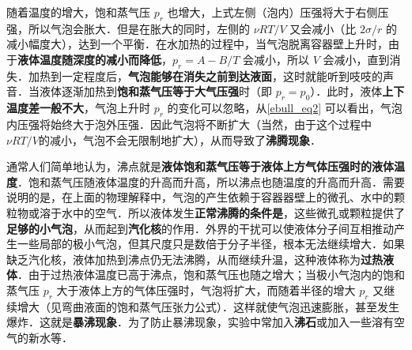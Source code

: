 随着温度的增大，饱和蒸气压 $p_r$ 也增大，上式左侧（泡内）压强将大于右侧压强，所以气泡会胀大．但是在胀大的同时，左侧的 $\nu RT/V$ 又会减小（比 $2\sigma/r$ 的减小幅度大），达到一个平衡．在水加热的过程中，当气泡脱离容器壁上升时，由于\textbf{液体温度随深度的减小而降低}，$p_r=A-B/T$ 会减小，所以 $V$ 会减小，直到消失．加热到一定程度后，\textbf{气泡能够在消失之前到达液面}，这时就能听到吱吱的声音．当液体逐渐加热到\textbf{饱和蒸气压等于大气压强}时（即 $p_r=p_0$）．此时，液体\textbf{上下温度差一般不大}，气泡上升时 $p_r$ 的变化可以忽略，从\autoref{ebull_eq2} 可以看出，气泡内压强将始终大于泡外压强．因此气泡将不断扩大（当然，由于这个过程中 $\nu RT/V$的减小，气泡不会无限制地扩大），从而导致了\textbf{沸腾现象}．

通常人们简单地认为，沸点就是\textbf{液体饱和蒸气压等于液体上方气体压强时的液体温度}．饱和蒸气压随液体温度的升高而升高，所以沸点也随温度的升高而升高．需要说明的是，在上面的物理解释中，气泡的产生依赖于容器器壁上的微孔、水中的颗粒物或溶于水中的空气．所以液体发生\textbf{正常沸腾的条件是}，这些微孔或颗粒提供了\textbf{足够的小气泡}，从而起到\textbf{汽化核}的作用．外界的干扰可以使液体分子间互相推动产生一些局部的极小气泡，但其尺度只是数倍于分子半径，根本无法继续增大．如果缺乏汽化核，液体加热到沸点仍无法沸腾，从而继续升温，这种液体称为\textbf{过热液体}．由于过热液体温度已高于沸点，饱和蒸气压也随之增大；当极小气泡内的饱和蒸气压 $p_r$ 大于液体上方的气体压强时，气泡将扩大，而随着半径的增大 $p_r$ 又继续增大（见弯曲液面的饱和蒸气压张力公式）．这样就使气泡迅速膨胀，甚至发生爆炸．这就是\textbf{暴沸现象}．为了防止暴沸现象，实验中常加入\textbf{沸石}或加入一些溶有空气的新水等．